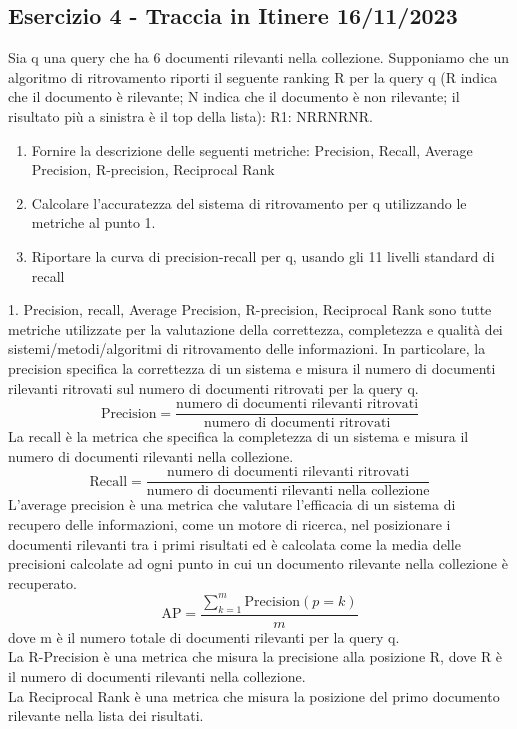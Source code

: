 \documentclass{report}
\begin{document}
	\subsection*{Esercizio 4  - Traccia in Itinere 16/11/2023}
	Sia q una query che ha 6 documenti rilevanti nella collezione. Supponiamo che un algoritmo di ritrovamento riporti il seguente ranking R per la query q (R indica che il documento è rilevante; N indica che il documento è non rilevante; il risultato più a sinistra è il top della lista): R1: NRRNRNR.
	\begin{enumerate}
		\item Fornire la descrizione delle seguenti metriche: Precision, Recall, Average Precision, 
		R-precision, Reciprocal Rank
		\item Calcolare l’accuratezza del sistema di ritrovamento per q utilizzando le metriche al punto 1.  
		\item Riportare la curva di precision-recall per q, usando gli 11 livelli standard di recall 
	\end{enumerate}	
	1. Precision, recall, Average Precision, R-precision, Reciprocal Rank sono tutte metriche utilizzate per la valutazione della correttezza, completezza e qualità dei sistemi/metodi/algoritmi di ritrovamento delle informazioni. In particolare, la precision specifica la correttezza di un sistema e misura il numero di documenti rilevanti ritrovati sul numero di documenti ritrovati per la query q.
	\[
		\text{Precision} = \frac{\text{numero di documenti rilevanti ritrovati}}{\text{numero di documenti ritrovati}}
	\]
	La recall è la metrica che specifica la completezza di un sistema e misura il numero di documenti rilevanti nella collezione. 
	\[
		\text{Recall} = \frac{\text{numero di documenti rilevanti ritrovati}}{\text{numero di documenti rilevanti nella collezione}}
	\]
	L'average precision è una metrica che valutare l’efficacia di un sistema di recupero delle informazioni, come un motore di ricerca, nel posizionare i documenti rilevanti tra i primi risultati ed è calcolata come la media delle precisioni calcolate ad ogni punto in cui un documento rilevante nella collezione è recuperato.
	\[
		\text{AP} = \frac{\sum_{k=1}^{m} \text{Precision}(p=k)}{m}
	\]
	dove m è il numero totale di documenti rilevanti per la query q.\\
	La R-Precision è una metrica che misura la precisione alla posizione R, dove R è il numero di documenti rilevanti nella collezione. \\
	La Reciprocal Rank è una metrica che misura la posizione del primo documento rilevante nella lista dei risultati.
\end{document}
